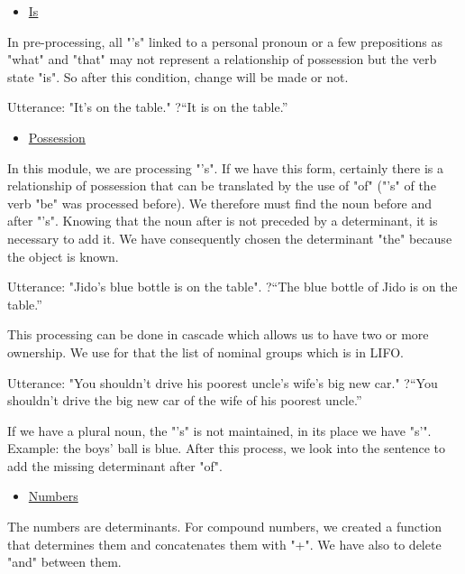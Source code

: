 \documentclass[twoside,a4paper,10pt]{report}
\begin{document}
\begin{itemize}
    \item  \underline{Is}
\end{itemize}
In pre-processing, all "’s" linked to a personal pronoun or a few prepositions as "what" and "that" may not represent a relationship of possession but the verb state "is". So after this condition, change will be made or not.


\small
\begin{verbatimtab}
  Utterance: "It's on the table."
  ?“It is on the table.” 
\end{verbatimtab}
\normalsize

\begin{itemize}
    \item  \underline{Possession}
\end{itemize}
In this module, we are processing "’s". If we have this form, certainly there is a relationship of possession that can be translated by the use of "of" ("’s" of the verb "be" was processed before). We therefore must find the noun before and after "’s". Knowing that the noun after is not preceded by a determinant, it is necessary to add it. We have consequently chosen the determinant "the" because the object is known.


\small
\begin{verbatimtab}
  Utterance: "Jido's blue bottle is on the table". 
  ?“The blue bottle of Jido is on the table.” 
\end{verbatimtab}
\normalsize
This processing can be done in cascade which allows us to have two or more ownership. We use for that the list of nominal groups which is in LIFO.


\small
\begin{verbatimtab}
  Utterance: "You shouldn't drive his poorest uncle's wife's big new car." 
  ?“You shouldn’t drive the big new car of the wife of his poorest uncle.”
\end{verbatimtab}
\normalsize
If we have a plural noun, the "’s" is not maintained, in its place we have "s’".
Example: the boys' ball is blue.
After this process, we look into the sentence to add the missing determinant after "of".



\begin{itemize}
    \item  \underline{Numbers}
\end{itemize}
The numbers are determinants. For compound numbers, we created a function that determines them and concatenates them with "+". We have also to delete "and" between them.
\end{document}
